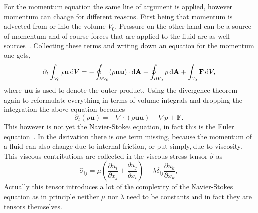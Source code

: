 For the momentum equation the same line of argument is applied, however momentum can change for different reasons.
First being that momentum is advected from or into the volume $V_0$.
Pressure on the other hand can be a source of momentum and of course forces that are applied to the fluid are as well sources~\cite{krueger2017}.
Collecting these terms and writing down an equation for the momentum one gets,
\begin{equation}\label{eq:navier_stokes_1}
    \partial_t \int_{V_0}\rho\mathbf{u}\mathop{}\!\mathrm{d} V = -\oint_{\partial V_0}(\rho\mathbf{u}\mathbf{u})\cdot\mathop{}\!\mathrm{d}\textbf{A} - \oint_{\partial V_0} p\mathop{}\!\mathrm{d}\textbf{A} + \int_{V_0} \textbf{F}\mathop{}\!\mathrm{d} V, 
\end{equation}
where $\mathbf{u}\mathbf{u}$ is used to denote the outer product.
Using the divergence theorem again to reformulate everything in terms of volume integrals and dropping the integration the above equation becomes
\begin{equation}\label{eq:navier_stokes_2}
    \partial_t(\rho\mathbf{u}) = -\nabla\cdot(\rho\mathbf{u}\mathbf{u}) - \nabla p + \textbf{F}.
\end{equation}
This however is not yet the Navier-Stokes equation, in fact this is the Euler equation~\cite{batchelor2000introduction}.
In the derivation there is one term missing, because the momentum of a fluid can also change due to internal friction, or put simply, due to viscosity.
This viscous contributions are collected in the viscous stress tensor $\hat{\sigma}$ as
\begin{equation}\label{eq:stress_tens}
    \hat{\sigma}_{ij} = \mu\left(\frac{\partial u_i}{\partial x_j} + \frac{\partial u_j}{\partial x_i}\right) + \lambda\delta_{ij}\frac{\partial u_k}{\partial x_k},
\end{equation}
Actually this tensor introduces a lot of the complexity of the Navier-Stokes equation as in principle neither $\mu$ nor $\lambda$ need to be constants and in fact they are tensors themselves.

